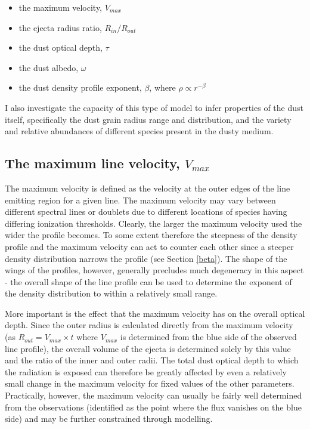 \begin{itemize}
\item the maximum velocity, $V_{max}$
\item the ejecta radius ratio, $R_{in}/R_{out}$
\item the dust optical depth,  $\tau$
\item the dust albedo, $\omega$ 
\item the dust density profile exponent, $\beta$, where $\rho \propto r^{-\beta}$
\end{itemize}

I also investigate the capacity of this type of model to infer properties of the dust itself, specifically the dust grain radius range and distribution, and the variety and relative abundances of different species present in the dusty medium. 


\subsection{The maximum line velocity, $V_{max}$}

The maximum velocity is defined as the velocity at the outer edges of the 
line emitting region for a given line.  The maximum velocity may vary 
between different spectral lines or doublets due to different locations of 
species having differing ionization thresholds.  Clearly, the larger the 
maximum velocity used the wider the profile becomes.  To some extent 
therefore the steepness of the density profile and the maximum velocity 
can act to counter each other since a steeper density distribution narrows 
the profile (see Section \ref{beta}).  The shape of the wings of the 
profiles, however, generally precludes much degeneracy in this aspect - the 
overall shape of the line profile can be used to determine the exponent of 
the density distribution to within a relatively small range.

More important is the effect that the maximum velocity has on the overall 
optical depth.  Since the outer radius is calculated directly from the 
maximum velocity (as $R_{out}=V_{max} \times t$ where $V_{max}$ is determined from the blue side of the observed line profile), the overall volume of the ejecta is determined solely by 
this value and the ratio of the inner and outer radii.  The total dust 
optical depth to which the radiation is exposed can therefore be greatly 
affected by even a relatively small change in the maximum velocity for 
fixed values of the other parameters.  Practically, however, the maximum 
velocity can usually be fairly well determined from the observations 
(identified as the point where the flux vanishes on the blue side) and may 
be further constrained through modelling.

